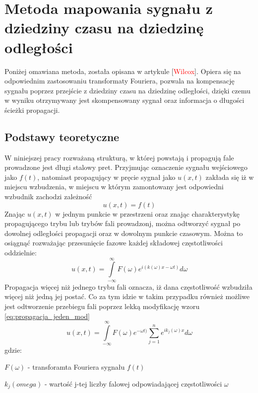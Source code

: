 \section{Metoda mapowania sygnału z dziedziny czasu na dziedzinę odległości}
\label{sec:Wilcox}

Poniżej omawiana metoda, została opisana w artykule [\textcolor{red}{Wilcox}]. Opiera się na odpowiednim zastosowaniu transformaty Fouriera, pozwala na kompensację sygnału poprzez przejście z dziedziny czasu na dziedzinę odległości, dzięki czemu w wyniku otrzymywany jest skompensowany sygnał oraz informacja o długości ścieżki propagacji.

\subsection{Podstawy teoretyczne}

W niniejszej pracy rozważaną strukturą, w której powstają i propagują fale prowadzone jest długi stalowy pret. Przyjmując oznaczenie sygnału wejściowego jako $f(t)$, natomiast propagujący w pręcie sygnał jako $u(x,t)$ zakłada się iż w miejscu wzbudzenia, w miejscu w którym zamontowany jest odpowiedni wzbudnik zachodzi zależność 
\begin{equation}
u(x,t) = f(t)
\end{equation}
Znając $u(x,t)$ w jednym punkcie w przestrzeni oraz znając charakterystykę propagującego trybu lub trybów fali prowadzonj, można odtworzyć sygnał po dowolnej odległości propagacji oraz w dowolnym punkcie czasowym. Można to osiągnąć rozważając przesunięcie fazowe każdej składowej częstotliwości oddzielnie:
\begin{equation}
u(x,t) = \int\limits_{-\infty}^{\infty}F(\omega)e^{i(k(\omega)x - \omega t)}d\omega \label{eq:propagacja_jeden_mod}
\end{equation}
Propagacja więcej niż jednego trybu fali oznacza, iż dana częstotliwość wzbudziła więcej niż jedną jej postać. Co za tym idzie w takim przypadku również możliwe jest odtworzenie przebiegu fali poprzez lekką modyfikację wzoru \ref{eq:propagacja_jeden_mod}
\begin{equation}
u(x,t) = \int\limits_{-\infty}^{\infty}F(\omega)e^{ - \omega t)}\sum \limits _{j=1}^{n}e^{ik_j(\omega)x} d\omega\label{eq:propagacja_kilka_mod}
\end{equation}
gdzie:

$F(\omega)$ - transforamta Fouriera sygnału $f(t)$

$k_j(omega)$ - wartość j-tej liczby falowej odpowiadającej częstotliwości $\omega$

